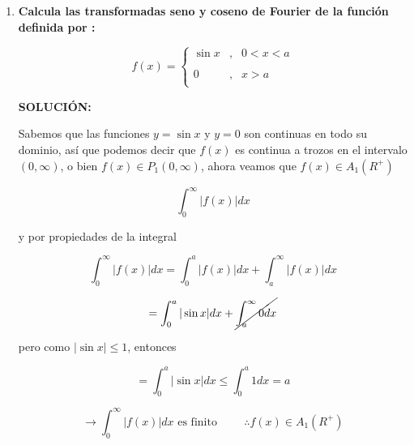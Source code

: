 \documentclass[12pt,a4paper]{article}
\begin{document}
\begin{enumerate}






    \item \textbf{Calcula las transformadas seno y coseno de Fourier de la función definida por :}
    
    \begin{equation*}
        f(x)= \left\{ \begin{array}{lcc}
             \sin{x} &   ,  & 0 < x < a\\
             \\ 0 &  , &  x > a \\
             \end{array}
        \right.
    \end{equation*}
    
    \textbf{SOLUCIÓN:}
    
    Sabemos que las funciones $y=\sin{x}$ y $y=0$ son continuas en todo su dominio, así que podemos decir que $f(x)$ es continua a trozos en el intervalo $(0,\infty)$, o bien $f(x) \in P_1(0,\infty)$, ahora veamos que $f(x) \in A_1(R^{+})$
    
    \begin{equation*}
        \int_{0}^{\infty} |f(x)|dx
    \end{equation*}
    
    y por propiedades de la integral
    
    \begin{equation*}
       \int_{0}^{\infty} |f(x)|dx = \int_{0}^{a} |f(x)| dx + \int_{a}^{\infty} |f(x)|dx
    \end{equation*}
    
    \begin{equation*}
        = \int_{0}^{a} |\sin{x}| dx + \cancel{\int_{a}^{\infty} 0dx}
    \end{equation*}
    
    pero como $|\sin{x}| \leq 1$, entonces
    
    \begin{equation*}
        = \int_{0}^{a} |\sin{x}| dx \leq \int_{0}^{a} 1 dx = a
    \end{equation*}
    
    \begin{equation*}
        \rightarrow \int_{0}^{\infty} |f(x)| dx \text{ es finito} \hspace{1cm} \therefore f(x) \in A_1(R^{+})
    \end{equation*}
    

\end{enumerate}
\end{document}
